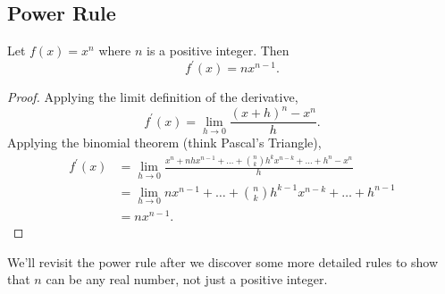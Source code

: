 \subsection{Power Rule}
\begin{lemma}
	Let $f(x) = x^n$ where $n$ is a positive integer. Then
	\begin{equation}
		f^\prime(x) = nx^{n-1}.
	\end{equation}
\end{lemma}
\begin{proof}
	Applying the limit definition of the derivative,
	\begin{equation*}
		f^\prime(x) = \lim_{h \to 0}{\frac{(x+h)^n - x^n}{h}}.
	\end{equation*}
	Applying the binomial theorem (think Pascal's Triangle),
	\begin{align*}
		f^\prime(x) &= \lim_{h \to 0}{\frac{x^n + nhx^{n-1} + \ldots + {n \choose k}h^{k}x^{n-k} + \ldots + h^n - x^n}{h}} \\
		&= \lim_{h \to 0}{nx^{n-1} + \ldots + {n \choose k}h^{k-1}x^{n-k} + \ldots + h^{n-1}} \\
		&= nx^{n-1}.
	\end{align*}
\end{proof}

We'll revisit the power rule after we discover some more detailed rules to show that $n$ can be any real number, not just a positive integer.